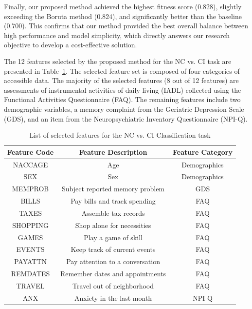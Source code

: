 Finally, our proposed method achieved the highest fitness score (0.828), slightly exceeding the Boruta method (0.824), and significantly better than the baseline (0.700). This confirms that our method provided the best overall balance between high performance and model simplicity, which directly answers our research objective to develop a cost-effective solution.

The 12 features selected by the proposed method for the NC vs. CI task are presented in Table~\ref{table:features-task1}. The selected feature set is composed of four categories of accessible data. The majority of the selected features (8 out of 12 features) are assessments of instrumental activities of daily living (\acrshort{IADL}) collected using the Functional Activities Questionnaire (\acrshort{FAQ}). The remaining features include two demographic variables, a memory complaint from the Geriatric Depression Scale (\acrshort{GDS}), and an item from the Neuropsychiatric Inventory Questionnaire (\acrshort{NPI-Q}).

\begin{table}[h!]
\centering
\caption{List of selected features for the NC vs. CI Classification task}
\label{table:features-task1}
\begin{tabular}{ccc}
\toprule
\textbf{Feature Code} & \textbf{Feature Description} & \textbf{Feature Category} \\
\midrule
NACCAGE & Age & Demographics \\
SEX & Sex & Demographics \\
MEMPROB & Subject reported memory problem & GDS \\
BILLS & Pay bills and track spending & FAQ \\
TAXES & Assemble tax records & FAQ \\
SHOPPING & Shop alone for necessities & FAQ \\
GAMES & Play a game of skill & FAQ \\
EVENTS & Keep track of current events & FAQ \\
PAYATTN & Pay attention to a conversation & FAQ \\
REMDATES & Remember dates and appointments & FAQ \\
TRAVEL & Travel out of neighborhood & FAQ \\
ANX & Anxiety in the last month & NPI-Q \\
\bottomrule
\end{tabular}
\end{table}

